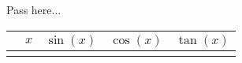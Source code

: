 \documentclass{article}
\newcommand{\trigtable}{\luadirect{trigtable()}}
\begin{document}
Pass here...

\begin{tabular}{rcccc}
\hline
& $x$ & $\sin(x)$ & $\cos(x)$ & $\tan(x)$ \\
\hline
\trigtable
\hline
\end{tabular}
\end{document}
